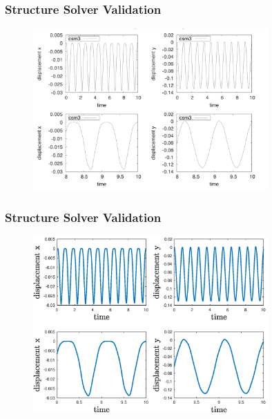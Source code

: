 \documentclass{beamer}
\begin{document}
\begin{frame}
\frametitle{Structure Solver Validation}

\begin{figure}[h]
\centering
	\includegraphics[width=0.8\textwidth]{CSM_1}
	\label{fig:CSM_1}
\end{figure}

\end{frame}

\begin{frame}
\frametitle{Structure Solver Validation}

\begin{figure}[h]
\centering
	\includegraphics[width=0.8\textwidth]{CSM_2}
	\label{fig:CSM_2}
\end{figure}

\end{frame}
\end{document}
